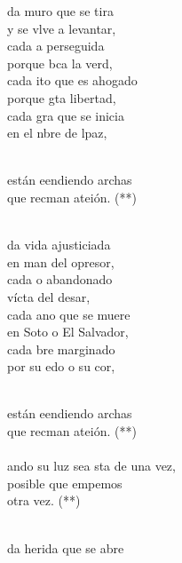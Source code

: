 \begin{cancion}%
	da muro que se tira\\
	y se vlve a levantar,\\
	cada a perseguida \\
	porque bca la verd,\\
	cada ito que es ahogado\\
	porque gta libertad,\\
	cada gra que se inicia\\
	en el nbre de lpaz,\\\jump\\
	\begin{chorus}%
	están eendiendo archas\\
	que recman ateión. (**)\\
	\end{chorus}%
	\jump\\
	da vida ajusticiada\\
	en man del opresor,\\
	cada o abandonado \\
	vícta del desar,\\
	cada ano que se muere\\
	en Soto o El Salvador,\\
	cada bre marginado\\
	por su edo o su cor, \\\jump\\
	\begin{chorus}%
	están eendiendo archas\\
	que recman ateión. (**)\\
\jump\\
	ando su luz sea sta de una vez,\\
	posible que empemos \\
otra vez. (**)\\
	\end{chorus}%
	\jump\\
	da herida que se abre \\

\end{cancion}

